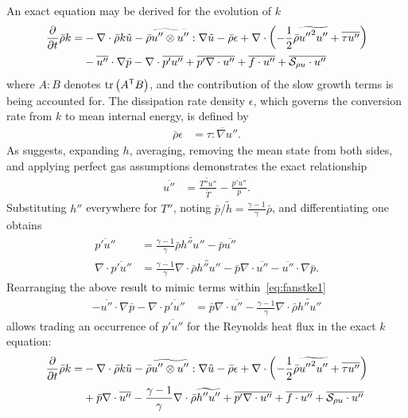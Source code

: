An exact equation may be derived for the evolution of $k$
\citep[\textsection{}5]{OliverFANSModels2011}
\begin{align}
\label{eq:fanstke1}
    \frac{\partial{}}{\partial{}t}\bar{\rho}k
 =
 &- \nabla\cdot\bar{\rho}k\tilde{u}
  - \bar{\rho} \widetilde{u''\otimes{}u''} : \nabla\tilde{u}
  - \bar{\rho} \epsilon
  + \nabla\cdot\left(
        -\frac{1}{2}\bar{\rho}\widetilde{{u''}^{2}u''}
      + \overline{\tau{}u''}
    \right)
\\
 &- \overline{u''}\cdot\nabla\bar{p}
  - \nabla\cdot\overline{p' u''}
  + \overline{p' \nabla\cdot{}u''}
  + \overline{f\cdot{}u''}
  + \overline{\mathcal{S}_{\rho{} u}\cdot{}u''}
\end{align}
where $A:B$ denotes $\operatorname{tr} \left({A}^{\mathsf{T}} B\right)$, and the contribution of
the slow growth terms is being accounted for. The dissipation rate
density $\epsilon$, which governs the conversion rate from $k$ to mean internal
energy, is defined by
\begin{align}
  \bar{\rho} \epsilon &= \overline{\tau : \nabla{}u''}
.
\end{align}
As \citet[page 216]{Lele1994Compressibility} suggests, expanding $h$,
averaging, removing the mean state from both sides, and applying perfect gas
assumptions demonstrates the exact relationship
\begin{align}
  \overline{u''}
&=
  \frac{\widetilde{T''u''}}{\tilde{T}} - \frac{\overline{p'u''}}{\bar{p}}
.
\end{align}
Substituting $h''$ everywhere for $T''$, noting $\bar{p}/\tilde{h} =
\frac{\gamma-1}{\gamma}\bar{\rho}$, and differentiating one obtains
\begin{align}
  \overline{p'u''}
&=
  \frac{\gamma-1}{\gamma} \bar{\rho} \widetilde{h''u''}
- \bar{p} \overline{u''}
\\
  \nabla\cdot \overline{p'u''}
&=
  \frac{\gamma-1}{\gamma} \nabla\cdot \bar{\rho} \widetilde{h''u''}
- \bar{p}\nabla\cdot\overline{u''}
- \overline{u''}\cdot\nabla{}\bar{p}
.
\end{align}
Rearranging the above result to mimic terms within~\eqref{eq:fanstke1}
\begin{align}
  - \overline{u''}\cdot\nabla\bar{p}
  - \nabla\cdot\overline{p'u''}
&=
  \bar{p}\nabla\cdot\overline{u''}
- \frac{\gamma-1}{\gamma} \nabla\cdot \bar{\rho} \widetilde{h''u''}
\end{align}
allows trading an occurrence of $\overline{p'u''}$ for the Reynolds heat
flux in the exact $k$ equation:
\begin{align}
\label{eq:fanstke}
    \frac{\partial{}}{\partial{}t}\bar{\rho}k
 =
 &- \nabla\cdot\bar{\rho}k\tilde{u}
  - \bar{\rho} \widetilde{u''\otimes{}u''} : \nabla\tilde{u}
  - \bar{\rho} \epsilon
  + \nabla\cdot\left(
        -\frac{1}{2}\bar{\rho}\widetilde{{u''}^{2}u''}
      + \overline{\tau{}u''}
    \right)
\\
 &+ \bar{p}\nabla\cdot\overline{u''}
  - \frac{\gamma-1}{\gamma} \nabla\cdot\bar{\rho} \widetilde{h''u''}
  + \overline{p' \nabla\cdot{}u''}
  + \overline{f\cdot{}u''}
  + \overline{\mathcal{S}_{\rho{} u}\cdot{}u''}
\end{align}
